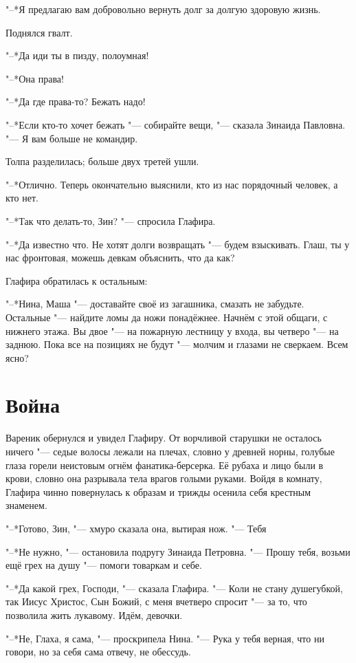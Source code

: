 "--*Я предлагаю вам добровольно вернуть долг за долгую здоровую жизнь.

Поднялся гвалт.

"--*Да иди ты в пизду, полоумная!

"--*Она права!

"--*Да где права-то?
Бежать надо!

"--*Если кто-то хочет бежать "--- собирайте вещи, "--- сказала Зинаида Павловна.
"--- Я вам больше не командир.

Толпа разделилась;
больше двух третей ушли.

"--*Отлично.
Теперь окончательно выяснили, кто из нас порядочный человек, а кто нет.

"--*Так что делать-то, Зин? "--- спросила Глафира.

"--*Да известно что.
Не хотят долги возвращать "--- будем взыскивать.
Глаш, ты у нас фронтовая, можешь девкам объяснить, что да как?

Глафира обратилась к остальным:

"--*Нина, Маша "--- доставайте своё из загашника, смазать не забудьте.
Остальные "--- найдите ломы да ножи понадёжнее.
Начнём с этой общаги, с нижнего этажа.
Вы двое "--- на пожарную лестницу у входа, вы четверо "--- на заднюю.
Пока все на позициях не будут "--- молчим и глазами не сверкаем.
Всем ясно? 

\section{Война}

Вареник обернулся и увидел Глафиру.
От ворчливой старушки не осталось ничего "--- седые волосы лежали на плечах, словно у древней норны, голубые глаза горели неистовым огнём фанатика-берсерка.
Её рубаха и лицо были в крови, словно она разрывала тела врагов голыми руками.
Войдя в комнату, Глафира чинно повернулась к образам и трижды осенила себя крестным знаменем.

"--*Готово, Зин, "--- хмуро сказала она, вытирая нож.
"--- Тебя\ldotsq

"--*Не нужно, "--- остановила подругу Зинаида Петровна.
"--- Прошу тебя, возьми ещё грех на душу "--- помоги товаркам и себе.

"--*Да какой грех, Господи, "--- сказала Глафира.
"--- Коли не стану душегубкой, так Иисус Христос, Сын Божий, с меня вчетверо спросит "--- за то, что позволила жить лукавому.
Идём, девочки.

"--*Не, Глаха, я сама, "--- проскрипела Нина.
"--- Рука у тебя верная, что ни говори, но за себя сама отвечу, не обессудь.

